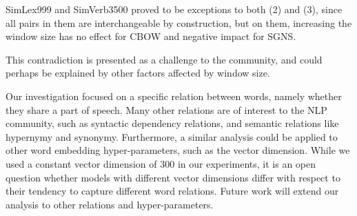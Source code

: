 \documentclass[11pt,a4paper]{article}
\begin{document}
    SimLex999 and SimVerb3500 proved to be exceptions to both (2) and (3),
    since all pairs in them are interchangeable by construction,
    but on them, increasing the window size has no effect for CBOW
    and negative impact for SGNS.
    
    This contradiction is presented as a challenge to the community,
    and could perhaps be explained by other factors affected by window size.
    
    Our investigation focused on a specific relation between words,
    namely whether they share a part of speech.
    Many other relations are of interest to the NLP
    community, such as syntactic dependency relations,
    and semantic relations like hypernymy and synonymy.
    Furthermore, a similar analysis could be applied to other word
    embedding hyper-parameters, such as the vector dimension.
    While we used a constant vector dimension of 300 in our experiments,
    it is an open question whether models with different vector dimensions
    differ with respect to their tendency to capture different word relations.
    Future work will extend our analysis to other relations and hyper-parameters.

    
    
    
\end{document}
